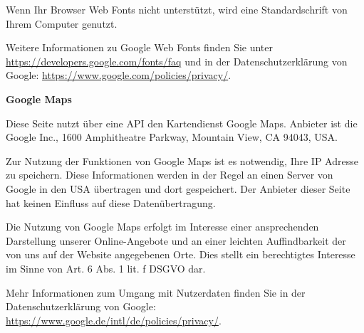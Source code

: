 \documentclass[12pt,a4paper]{scrartcl}
\begin{document}
Wenn Ihr Browser Web Fonts nicht unterstützt, wird eine Standardschrift
von Ihrem Computer genutzt.

Weitere Informationen zu Google Web Fonts finden Sie unter
\url{https://developers.google.com/fonts/faq} und in der
Datenschutzerklärung von Google:
\url{https://www.google.com/policies/privacy/}.

\textbf{Google Maps}

Diese Seite nutzt über eine API den Kartendienst Google Maps. Anbieter
ist die Google Inc., 1600 Amphitheatre Parkway, Mountain View, CA 94043,
USA.

Zur Nutzung der Funktionen von Google Maps ist es notwendig, Ihre IP
Adresse zu speichern. Diese Informationen werden in der Regel an einen
Server von Google in den USA übertragen und dort gespeichert. Der
Anbieter dieser Seite hat keinen Einfluss auf diese Datenübertragung.

Die Nutzung von Google Maps erfolgt im Interesse einer ansprechenden
Darstellung unserer Online-Angebote und an einer leichten Auffindbarkeit
der von uns auf der Website angegebenen Orte. Dies stellt ein
berechtigtes Interesse im Sinne von Art. 6 Abs. 1 lit. f DSGVO dar.

Mehr Informationen zum Umgang mit Nutzerdaten finden Sie in der
Datenschutzerklärung von Google:
\url{https://www.google.de/intl/de/policies/privacy/}. %
\end{document}
